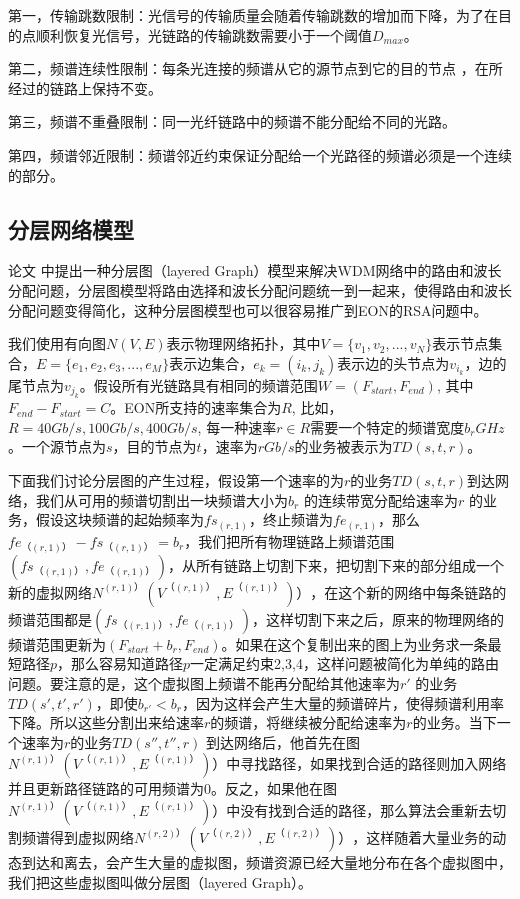 第一，传输跳数限制：光信号的传输质量会随着传输跳数的增加而下降，为了在目的点顺利恢复光信号，光链路的传输跳数需要小于一个阈值$D_{max}$。

第二，频谱连续性限制：每条光连接的频谱从它的源节点到它的目的节点 ，在所经过的链路上保持不变。

第三，频谱不重叠限制：同一光纤链路中的频谱不能分配给不同的光路。

第四，频谱邻近限制：频谱邻近约束保证分配给一个光路径的频谱必须是一个连续的部分。
\subsection{分层网络模型}
论文 中提出一种分层图（layered Graph）模型来解决WDM网络中的路由和波长分配问题，分层图模型将路由选择和波长分配问题统一到一起来，使得路由和波长分配问题变得简化，这种分层图模型也可以很容易推广到EON的RSA问题中。

我们使用有向图$N(V,E)$表示物理网络拓扑，其中$V=\{v_1,v_2,...,v_N\}$表示节点集合，$E=\{e_1,e_2,e_3,...,e_M\}$表示边集合，$e_k=(i_k,j_k)$表示边的头节点为$v_{i_k}$，边的尾节点为$v_{j_k}$。假设所有光链路具有相同的频谱范围$W=(F_{start},F_{end})$, 其中$F_{end}-F_{start}=C$。EON所支持的速率集合为$R$, 比如，$R={40Gb/s,100Gb/s,400Gb/s}$, 每一种速率$r\in R$需要一个特定的频谱宽度$b_r GHz$。一个源节点为$s$，目的节点为$t$，速率为$r Gb/s$的业务被表示为$TD(s,t,r)$。

下面我们讨论分层图的产生过程，假设第一个速率的为$r$的业务$TD(s,t,r)$到达网络，我们从可用的频谱切割出一块频谱大小为$b_r$ 的连续带宽分配给速率为$r$ 的业务，假设这块频谱的起始频率为$fs_{( r,1 )}$，终止频谱为$fe_{( r,1 )}$，那么$fe_{（ (r,1) ）}-fs_{（ (r,1) ）}=b_r$，我们把所有物理链路上频谱范围$( fs_{（ (r,1) ）},fe_{（ (r,1) ）} )$，从所有链路上切割下来，把切割下来的部分组成一个新的虚拟网络$N^{( r,1) ）} ( V^{（ (r,1) ）},E^{（ (r,1) ）}) ）$，在这个新的网络中每条链路的频谱范围都是$(fs_{（ (r,1) ）},fe_{（ (r,1) ）})$，这样切割下来之后，原来的物理网络的频谱范围更新为$( F_{start}+b_r,F_{end} )$。如果在这个复制出来的图上为业务求一条最短路径$p$，那么容易知道路径$p$一定满足约束2,3,4，这样问题被简化为单纯的路由问题。要注意的是，这个虚拟图上频谱不能再分配给其他速率为$r'$ 的业务$TD(s',t',r')$，即使$b_{r'}<b_r$，因为这样会产生大量的频谱碎片，使得频谱利用率下降。所以这些分割出来给速率$r$的频谱，将继续被分配给速率为$r$的业务。当下一个速率为$r$的业务$TD (s'',t'',r)$ 到达网络后，他首先在图$N^{( r,1) ）} ( V^{（ (r,1) ）},E^{（ (r,1) ）}) ）$中寻找路径，如果找到合适的路径则加入网络并且更新路径链路的可用频谱为0。反之，如果他在图$N^{( r,1) ）} ( V^{（ (r,1) ）},E^{（ (r,1) ）}) ）$中没有找到合适的路径，那么算法会重新去切割频谱得到虚拟网络$N^{( r,2) ）} ( V^{（ (r,2) ）},E^{（ (r,2) ）}) ）$，这样随着大量业务的动态到达和离去，会产生大量的虚拟图，频谱资源已经大量地分布在各个虚拟图中，我们把这些虚拟图叫做分层图（layered Graph）。

